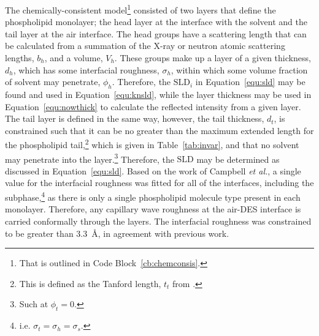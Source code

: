 The chemically-consistent model\footnote{That is outlined in Code Block~\ref{cb:chemconsis}.} consisted of two layers that define the phospholipid monolayer; the head layer at the interface with the solvent and the tail layer at the air interface.
The head groups have a scattering length that can be calculated from a summation of the X-ray or neutron atomic scattering lengths, $b_h$, and a volume, $V_h$.
These groups make up a layer of a given thickness, $d_h$, which has some interfacial roughness, $\sigma_h$, within which some volume fraction of solvent may penetrate, $\phi_h$.
Therefore, the $\text{SLD}_i$ in Equation~\ref{equ:sld} may be found and used in Equation~\ref{equ:knsld}, while the layer thickness may be used in Equation~\ref{equ:nowthick} to calculate the reflected intensity from a given layer. 
The tail layer is defined in the same way, however, the tail thickness, $d_t$, is constrained such that it can be no greater than the maximum extended length for the phospholipid tail,\footnote{This is defined as the Tanford length, $t_t$ from \cite{tanford_hydrophobic_1980}.} which is given in Table~\ref{tab:invar}, and that no solvent may penetrate into the layer.\footnote{Such at $\phi_t=0$.}
Therefore, the $\text{SLD}$ may be determined as discussed in Equation~\ref{equ:sld}.
Based on the work of Campbell \emph{et al.},\autocite{campbell_structure_2018} a single value for the interfacial roughness was fitted for all of the interfaces, including the subphase,\footnote{i.e. $\sigma_t = \sigma_h = \sigma_s$.} as there is only a single phospholipid molecule type present in each monolayer.
Therefore, any capillary wave roughness at the air-DES interface is carried conformally through the layers.
The interfacial roughness was constrained to be greater than \SI{3.3}{\angstrom}, in agreement with previous work.\autocite{sanchez-fernandez_micellization_2016}
%
